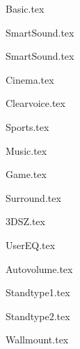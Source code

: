 {Basic.tex}

{SmartSound.tex}

{SmartSound.tex}

{Cinema.tex}

{Clearvoice.tex}

{Sports.tex}

{Music.tex}

{Game.tex}

{Surround.tex}

{3DSZ.tex}

{UserEQ.tex}

{Autovolume.tex}

{Standtype1.tex}

{Standtype2.tex}

{Wallmount.tex}